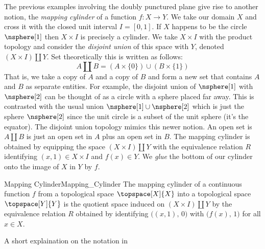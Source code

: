 \documentclass{book}                                                           %
\begin{document}
                The previous examples involving the doubly punctured plane give
                rise to another notion, the \textit{mapping cylinder} of a
                function $f:X\rightarrow{Y}$. We take our domain $X$ and cross
                it with the closed unit interval $I=[0,1]$. If $X$ happens to be
                the circle $\nsphere[1]$ then $X\times{I}$ is precisely a
                cylinder. We take $X\times{I}$ with the product topology and
                consider the \textit{disjoint union} of this space with $Y$,
                denoted $(X\times{I})\coprod{Y}$. Set theoretically this is
                written as follows:
                \begin{equation}
                    \label{eqn:Def_Disjoint_Union}%
                    A\coprod{B}=(A\times\{0\})\cup(B\times\{1\})
                \end{equation}
                That is, we take a copy of $A$ and a copy of $B$ and form a
                new set that contains $A$ and $B$ as separate entities. For
                example, the disjoint union of $\nsphere[1]$ with $\nsphere[2]$
                can be thought of as a circle with a sphere placed far away.
                This is contrasted with the usual union
                $\nsphere[1]\cup\nsphere[2]$ which is just the sphere
                $\nsphere[2]$ since the unit circle is a subset of the unit
                sphere (it's the equator). The disjoint union topology mimics
                this newer notion. An open set is $A\coprod{B}$ is just an open
                set in $A$ plus an open set in $B$. The mapping cylinder is
                obtained by equipping the space $(X\times{I})\coprod{Y}$ with
                the equivalence relation $R$ identifying $(x,1)\in{X}\times{I}$
                and $f(x)\in{Y}$. We \textit{glue} the bottom of our cylinder
                onto the image of $X$ in $Y$ by $f$.
                \begin{fdefinition}{Mapping Cylinder}{Mapping_Cylinder}
                    The mapping cylinder of a continuous function $f$ from a
                    topological space $\topspace[X]{X}$ into a topological space
                    $\topspace[Y]{Y}$ is the quotient space induced on
                    $(X\times{I})\coprod{Y}$ by the equivalence relation $R$
                    obtained by identifying $\big((x,1),\,0\big)$ with
                    $\big(f(x),\,1\big)$ for all $x\in{X}$.
                \end{fdefinition}
                A short explaination on the notation in
\end{document}
